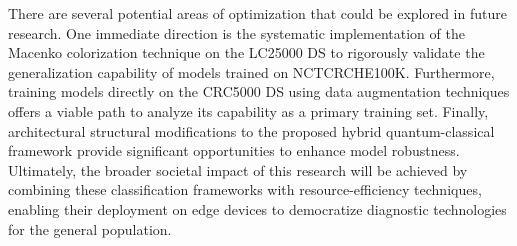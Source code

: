 There are several potential areas of optimization that could be explored in future research. One immediate direction is the systematic implementation of the Macenko colorization technique \cite{5193250} on the \gls{LC25000} \gls{DS} to rigorously validate the generalization capability of models trained on \gls{NCTCRCHE100K}. Furthermore, training models directly on the \gls{CRC5000} \gls{DS} using data augmentation techniques offers a viable path to analyze its capability as a primary training set. Finally, architectural structural modifications to the proposed hybrid quantum-classical framework \cite{quanvolution} provide significant opportunities to enhance model robustness. Ultimately, the broader societal impact of this research will be achieved by combining these classification frameworks with resource-efficiency techniques, enabling their deployment on edge devices to democratize diagnostic technologies for the general population.
